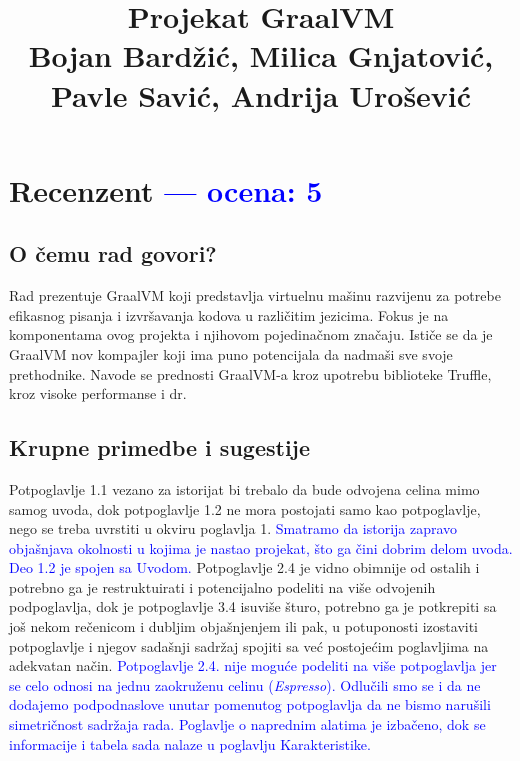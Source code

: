 \documentclass[a4paper]{report}
\newcommand{\odgovor}[1]{\textcolor{blue}{#1}}
\begin{document}
\title{Projekat GraalVM\\ \small{Bojan Bardžić, Milica Gnjatović, Pavle Savić, Andrija Urošević}}

\maketitle

\tableofcontents

\chapter{Recenzent \odgovor{--- ocena: 5} }
	
	
	\section{O čemu rad govori?}
	Rad prezentuje GraalVM koji predstavlja virtuelnu mašinu razvijenu za potrebe efikasnog pisanja i izvršavanja kodova u različitim jezicima. Fokus je na komponentama ovog projekta i njihovom pojedinačnom značaju. Ističe se da je GraalVM nov kompajler koji ima puno potencijala da nadmaši sve svoje prethodnike. Navode se prednosti GraalVM-a kroz upotrebu biblioteke Truffle, kroz visoke performanse i dr. 
	
	\section{Krupne primedbe i sugestije}
	Potpoglavlje 1.1 vezano za istorijat bi trebalo da bude odvojena celina mimo samog uvoda, dok potpoglavlje 1.2 ne mora postojati samo kao potpoglavlje, nego se treba uvrstiti u okviru poglavlja 1. 
	\odgovor{Smatramo da istorija zapravo objašnjava okolnosti u kojima je nastao projekat, što ga čini dobrim delom uvoda. Deo 1.2 je spojen sa Uvodom.}
    Potpoglavlje 2.4 je vidno obimnije od ostalih i potrebno ga je restruktuirati i potencijalno podeliti na više odvojenih podpoglavlja, dok je potpoglavlje 3.4 isuviše šturo, potrebno ga je potkrepiti sa još nekom rečenicom i dubljim objašnjenjem ili pak, u potuponosti izostaviti potpoglavlje i njegov sadašnji sadržaj spojiti sa već postojećim poglavljima na adekvatan način. \odgovor{Potpoglavlje 2.4. nije moguće podeliti na više potpoglavlja jer se celo odnosi na jednu zaokruženu celinu (\emph{Espresso}). Odlučili smo se i da ne dodajemo podpodnaslove unutar pomenutog potpoglavlja da ne bismo narušili simetričnost sadržaja rada. Poglavlje o naprednim alatima je izbačeno, dok se informacije i tabela sada nalaze u poglavlju Karakteristike.}
	
\end{document}
